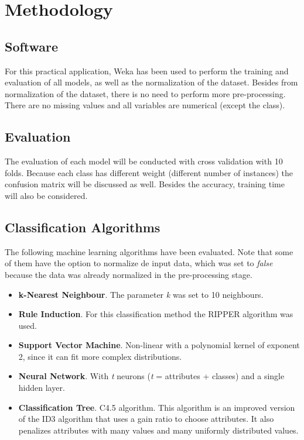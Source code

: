 \documentclass[a4paper,11pt]{article}
\begin{document}
\section{Methodology}
\label{sec:methodology}

\subsection{Software}
\label{subsec:software}

For this practical application, Weka \cite{weka} has been used to perform the training and evaluation of all models, as well as the normalization of the dataset. Besides from normalization of the dataset, there is no need to perform more pre-processing. There are no missing values and all variables are numerical (except the class).

\subsection{Evaluation}
\label{subsec:evaluation}

The evaluation of each model will be conducted with cross validation with 10 folds. Because each class has different weight (different number of instances) the confusion matrix will be discussed as well. Besides the accuracy, training time will also be considered.

\subsection{Classification Algorithms}
\label{subsec:algorithms}

The following machine learning algorithms have been evaluated. Note that some of them have the option to normalize de input data, which was set to \textit{false} because the data was already normalized in the pre-processing stage.

\begin{itemize}
\item \textbf{k-Nearest Neighbour}. The parameter \textit{k} was set to 10 neighbours.
\item \textbf{Rule Induction}. For this classification method the RIPPER algorithm was used.
\item \textbf{Support Vector Machine}. Non-linear with a polynomial kernel of exponent 2, since it can fit more complex distributions.
\item \textbf{Neural Network}. With \textit{t} neurons (\textit{t} = attributes + classes) and a single hidden layer.
\item \textbf{Classification Tree}. C4.5 algorithm. This algorithm is an improved version of the ID3 algorithm that uses a gain ratio to choose attributes. It also penalizes attributes with many values and many uniformly distributed values.
\end{itemize}
\end{document}
